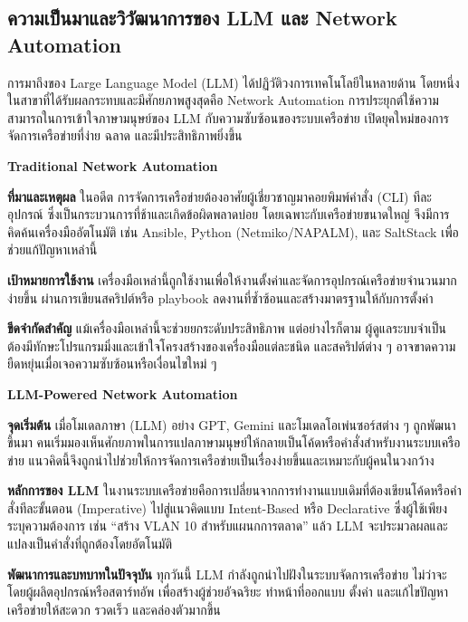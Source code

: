 \hspace*{1.3em} %

\hspace*{1.3em} %

\subsection{ความเป็นมาและวิวัฒนาการของ LLM และ Network Automation}

\hspace*{1.3em} %
การมาถึงของ Large Language Model (LLM) ได้ปฏิวัติวงการเทคโนโลยีในหลายด้าน โดยหนึ่งในสาขาที่ได้รับผลกระทบและมีศักยภาพสูงสุดคือ Network Automation การประยุกต์ใช้ความสามารถในการเข้าใจภาษามนุษย์ของ LLM กับความซับซ้อนของระบบเครือข่าย เปิดยุคใหม่ของการจัดการเครือข่ายที่ง่าย ฉลาด และมีประสิทธิภาพยิ่งขึ้น

\hspace*{1.3em} %
\textbf{Traditional Network Automation} %
\begin{mycustomitem}
    \item \textbf{ที่มาและเหตุผล} ในอดีต การจัดการเครือข่ายต้องอาศัยผู้เชี่ยวชาญมาคอยพิมพ์คำสั่ง (CLI) ทีละอุปกรณ์ ซึ่งเป็นกระบวนการที่ช้าและเกิดข้อผิดพลาดบ่อย โดยเฉพาะกับเครือข่ายขนาดใหญ่ จึงมีการคิดค้นเครื่องมืออัตโนมัติ เช่น Ansible, Python (Netmiko/NAPALM), และ SaltStack เพื่อช่วยแก้ปัญหาเหล่านี้
    \item \textbf{เป้าหมายการใช้งาน} เครื่องมือเหล่านี้ถูกใช้งานเพื่อให้งานตั้งค่าและจัดการอุปกรณ์เครือข่ายจำนวนมากง่ายขึ้น ผ่านการเขียนสคริปต์หรือ playbook ลดงานที่ซ้ำซ้อนและสร้างมาตรฐานให้กับการตั้งค่า
    \item \textbf{ขีดจำกัดสำคัญ} แม้เครื่องมือเหล่านี้จะช่วยยกระดับประสิทธิภาพ แต่อย่างไรก็ตาม ผู้ดูแลระบบจำเป็นต้องมีทักษะโปรแกรมมิ่งและเข้าใจโครงสร้างของเครื่องมือแต่ละชนิด และสคริปต์ต่าง ๆ อาจขาดความยืดหยุ่นเมื่อเจอความซับซ้อนหรือเงื่อนไขใหม่ ๆ
\end{mycustomitem}

\hspace*{1.3em} %
\textbf{LLM-Powered Network Automation} %
\begin{mycustomitem}
    \item \textbf{จุดเริ่มต้น} เมื่อโมเดลภาษา (LLM) อย่าง GPT, Gemini และโมเดลโอเพ่นซอร์สต่าง ๆ ถูกพัฒนาขึ้นมา คนเริ่มมองเห็นศักยภาพในการแปลภาษามนุษย์ให้กลายเป็นโค้ดหรือคำสั่งสำหรับงานระบบเครือข่าย แนวคิดนี้จึงถูกนำไปช่วยให้การจัดการเครือข่ายเป็นเรื่องง่ายขึ้นและเหมาะกับผู้คนในวงกว้าง
    \item \textbf{หลักการของ LLM} ในงานระบบเครือข่ายคือการเปลี่ยนจากการทำงานแบบเดิมที่ต้องเขียนโค้ดหรือคำสั่งทีละขั้นตอน (Imperative) ไปสู่แนวคิดแบบ Intent-Based หรือ Declarative ซึ่งผู้ใช้เพียงระบุความต้องการ เช่น \textquotedblleft สร้าง VLAN 10 สำหรับแผนกการตลาด” แล้ว LLM จะประมวลผลและแปลงเป็นคำสั่งที่ถูกต้องโดยอัตโนมัติ
    \item \textbf{พัฒนาการและบทบาทในปัจจุบัน} ทุกวันนี้ LLM กำลังถูกนำไปฝังในระบบจัดการเครือข่าย ไม่ว่าจะโดยผู้ผลิตอุปกรณ์หรือสตาร์ทอัพ เพื่อสร้างผู้ช่วยอัจฉริยะ ทำหน้าที่ออกแบบ ตั้งค่า และแก้ไขปัญหาเครือข่ายให้สะดวก รวดเร็ว และคล่องตัวมากขึ้น
\end{mycustomitem}


